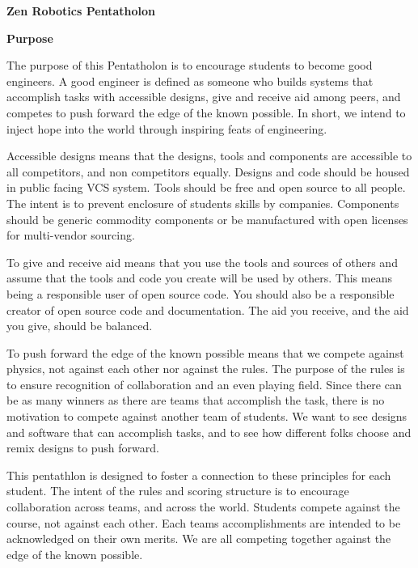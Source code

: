 \documentclass{article}
\begin{document}
	
{\huge \textbf{Zen Robotics Pentatholon}}

\vspace{1cm}


\vspace{1cm}

{\huge \textbf{Purpose}}
\vspace{1cm}

The purpose of this Pentatholon is to encourage students to become good engineers. A good engineer is defined as someone who builds systems that accomplish tasks with accessible designs, give and receive aid among peers, and competes to push forward the edge of the known possible. In short, we intend to inject hope into the world through inspiring feats of engineering.

Accessible designs means that the designs, tools and components are accessible to all competitors, and non competitors equally. Designs and code should be housed in public facing VCS system. Tools should be free and open source to all people. The intent is to prevent enclosure of students skills by companies.  Components should be generic commodity components or be manufactured with open licenses for multi-vendor sourcing.  

To give and receive aid means that you use the tools and sources of others and assume that the tools and code you create will be used by others. This means being a responsible user of open source code. You should also be a responsible creator of open source code and documentation. The aid you receive, and the aid you give, should be  balanced. 

To push forward the edge of the known possible means that we compete against physics, not against each other nor against the rules. The purpose of the rules is to ensure recognition of collaboration and an even playing field. Since there can be as many winners as there are teams that accomplish the task, there is no motivation to compete against another team of students. We want to see designs and software that can accomplish tasks, and to see how different folks choose and remix designs to push forward. 

  
This pentathlon is designed to foster a connection to these principles for each student. The intent of the rules and scoring structure is to encourage collaboration across teams, and across the world. Students compete against the course, not against each other. Each teams accomplishments are intended to be acknowledged on their own merits. We are all competing together against the edge of the known possible.
\pagebreak
\end{document}

